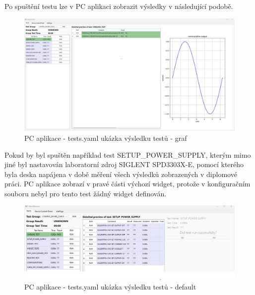 Po spuštění testu lze v PC aplikaci zobrazit výsledky v následující podobě.
\begin{figure}[ht!]
    \centering
    \includegraphics[width = 1\textwidth]{obrazky/test_result_widget_graph.png}
    \caption{PC aplikace - tests.yaml ukázka výsledku testů - graf}
    \label{fig: tests yaml graf}
\end{figure}

Pokud by byl spuštěn například test SETUP\_POWER\_SUPPLY, kterým mimo jiné byl nastavován laboratorní 
zdroj SIGLENT SPD3303X-E, pomocí kterého byla deska napájena v době měření všech výsledků zobrazených v diplomové práci.
PC aplikace zobrazí v pravé části výchozí widget, protože v konfiguračním souboru nebyl pro tento test žádný widget definován.
\begin{figure}[ht!]
    \centering
    \includegraphics[width = 1\textwidth]{obrazky/test_result_widget_prompt.png}
    \caption{PC aplikace - tests.yaml ukázka výsledku testů - default}
    \label{fig: tests yaml default}
\end{figure}


